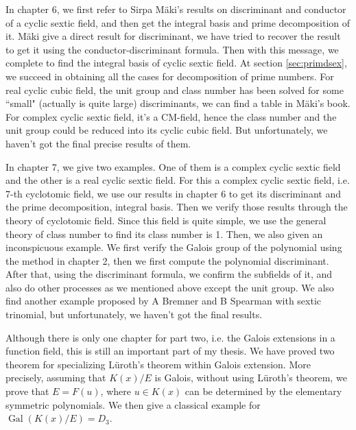 In chapter 6, we first refer to Sirpa M{\"a}ki's results \citep{maki1980determination} on discriminant and conductor of a cyclic sextic field, and then get the integral basis and prime decomposition of it.  M{\"a}ki give a direct result for discriminant, we have tried to recover the result to get it using the conductor-discriminant formula. Then with this message, we complete to find the integral basis of cyclic sextic field. At section \ref{sec:primdsex}, we succeed in obtaining all the cases for decomposition of prime numbers. For real cyclic cubic field, the unit group and class number has been solved for some ``small" (actually is quite large) discriminants, we can find a table in M{\"a}ki's book. For complex cyclic sextic field, it's a CM-field, hence the class number and the unit group could be reduced into its cyclic cubic field. But unfortunately, we haven't got the final precise results of them.

In chapter 7, we give two examples. One of them is a complex cyclic sextic field and the other is a real cyclic sextic field. For this a complex cyclic sextic field, i.e. 7-th cyclotomic field, we use our results in chapter 6 to get its discriminant and the prime decomposition, integral basis. Then we verify those results through the theory of  
cyclotomic field. Since this field is quite simple, we use the general theory of class number to find its class number is 1. Then, we also given an inconspicuous example. We first verify the Galois group of the polynomial using the method in chapter 2, then we first compute the polynomial discriminant. After that, using the discriminant formula, we confirm the subfields of it, and also do other processes as we mentioned above except the unit group. We also find another example proposed by A Bremner and B Spearman\citep{bremner2010cyclic} with sextic trinomial, but unfortunately, we haven't got the final results.

Although there is only one chapter for part two, i.e. the Galois extensions in a function field, this is still an important part of my thesis. We have proved two theorem for specializing L\"{u}roth's theorem within Galois extension. More precisely, assuming that $K(x)/E$ is Galois, without using L\"{u}roth's theorem, we prove that $E=F(u)$, where $u\in K(x)$ can be determined by the elementary symmetric polynomials. We then give a classical example for $\operatorname{Gal}(K(x)/E)=D_3$. 


